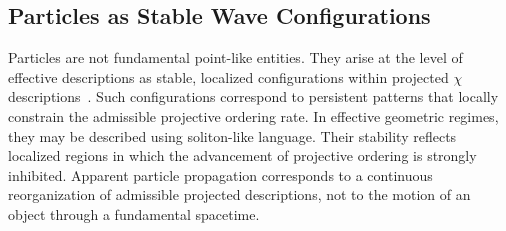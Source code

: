 \subsection{Particles as Stable Wave Configurations}
  \label{subsec:particles-as-stable-wave-configurations}

  Particles are not fundamental point-like entities.
  They arise at the level of effective descriptions as stable, localized
  configurations within projected $\chi$
  descriptions~\cite{Rajaraman1982}.
  Such configurations correspond to persistent patterns that locally
  constrain the admissible projective ordering rate.
  In effective geometric regimes, they may be described using soliton-like
  language.
  Their stability reflects localized regions in which the advancement of
  projective ordering is strongly inhibited.
  Apparent particle propagation corresponds to a continuous reorganization
  of admissible projected descriptions, not to the motion of an object
  through a fundamental spacetime.
